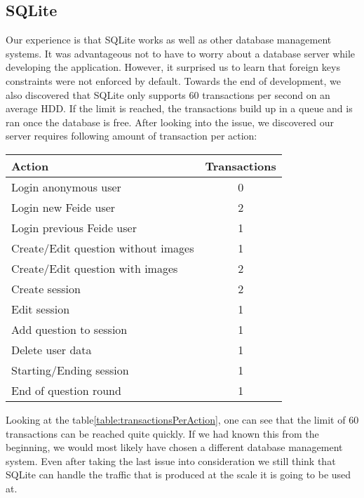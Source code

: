 \subsection{SQLite}
Our experience is that SQLite works as well as other database management systems. It was advantageous not to have to worry about a database server while developing the application. However, it surprised us to learn that foreign keys constraints were not enforced by default. Towards the end of development, we also discovered that SQLite only supports 60 transactions per second on an average HDD. If the limit is reached, the transactions build up in a queue and is ran once the database is free. After looking into the issue, we discovered our server requires following amount of transaction per action:
\begin{center}
    \begin{tabular}{|l|c|}
        \hline
        Action & Transactions \\
        \hline
        Login anonymous user & 0 \\
        \hline
        Login new Feide user & 2 \\
        \hline
        Login previous Feide user & 1 \\
        \hline
        Create/Edit question without images & 1 \\
        \hline
        Create/Edit question with images & 2 \\
        \hline
        Create session & 2 \\
        \hline
        Edit session & 1 \\
        \hline
        Add question to session & 1 \\
        \hline
        Delete user data & 1 \\
        \hline
        Starting/Ending session & 1 \\
        \hline
        End of question round & 1 \\
        \hline
    \end{tabular}
    \label{table:transactionsPerAction}
\end{center}
\noindent
Looking at the table\ref{table:transactionsPerAction}, one can see that the limit of 60 transactions can be reached quite quickly. If we had known this from the beginning, we would most likely have chosen a different database management system. Even after taking the last issue into consideration we still think that SQLite can handle the traffic that is produced at the scale it is going to be used at. 
